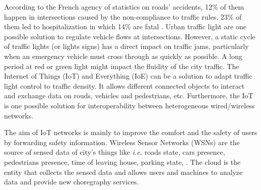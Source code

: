 \documentclass[conference]{../../setup/IEEEtran}
\begin{document}

According to the French agency of statistics on roads' accidents, 12\%  of them happen in intersections caused by the non-compliance to traffic rules. 23\% of them led to hospitalization in which 14\% are fatal \cite{Routiere2015}. Urban traffic light are one possible solution to regulate vehicle flows at intersections. However, a static cycle of traffic lights (or lights signs) has a direct impact on traffic jams, particularly when an emergency vehicle must cross through as quickly as possible. A long period at red or green light might impact the fluidity of the city traffic. 
The Internet of Things (IoT) and Everything (IoE) can be a solution to adapt traffic light control to traffic density. It allows different connected objects to interact and exchange data on rouds, vehicles and pedestrians, etc. Furthermore, the IoT is one possible solution for interoperability between heterogeneous wired/wireless networks. 
%

The aim of IoT networks is mainly to improve the comfort and the safety of users by forwarding safety information. Wireless Sensor Networks (WSNs) are the source of sensed data of city's things like 
	\emph{i.e.}
roads state,
	cars presence,
	pedestrians presence,
	time of leaving house,
	parking state, \cite{Perera2014}.
The cloud is the entity that collects the sensed data and allows users and machines to analyze data and provide new choregraphy services.

\end{document}
